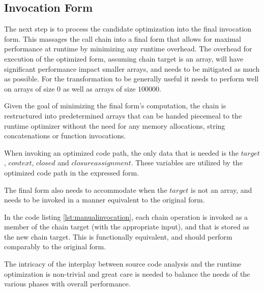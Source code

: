 \subsection{Invocation Form}
The next step is to process the candidate optimization into the final invocation form.  This massages the call chain into a final form that allows for maximal performance at runtime by minimizing any runtime overhead.  The overhead for execution of the optimized form, assuming chain target is an array, will have significant performance impact smaller arrays, and needs to be mitigated as much as possible.  For the transformation to be generally useful it needs to perform well on arrays of size $0$ as well as arrays of size $100000$.  

\begin{minipage}{\linewidth}

\end{minipage}

Given the goal of minimizing the final form's computation, the chain is restructured into predetermined arrays that can be handed piecemeal to the runtime optimizer without the need for any memory allocations, string concatenations or function invocations.

When invoking an optimized code path, the only data that is needed is the $target$, $context$, $closed$ and $closure assignment$.  These variables are utilized by the optimized code path in the expressed form. 

The final form also needs to accommodate when the $target$ is not an array, and needs to be invoked in a manner equivalent to the original form.  \\

\begin{minipage}{\linewidth}

\end{minipage}

In the code listing \ref{lst:manualinvocation}, each chain operation is invoked as a member of the chain target (with the appropriate input), and that is stored as the new chain target.  This is functionally equivalent, and should perform comparably to the original form. 




The intricacy of the interplay between source code analysis and the runtime optimization is non-trivial and great care is needed to balance the needs of the various phases with overall performance.  